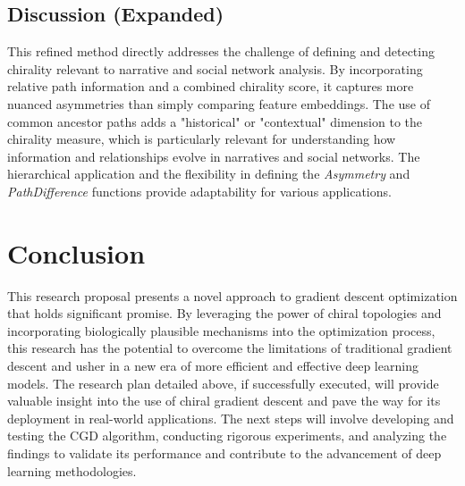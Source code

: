 \documentclass[12pt, a4paper]{article}
\begin{document}
\subsection{Discussion (Expanded)}

This refined method directly addresses the challenge of defining and detecting chirality relevant to narrative and social network analysis. By incorporating relative path information and a combined chirality score, it captures more nuanced asymmetries than simply comparing feature embeddings. The use of common ancestor paths adds a "historical" or "contextual" dimension to the chirality measure, which is particularly relevant for understanding how information and relationships evolve in narratives and social networks. The hierarchical application and the flexibility in defining the \textit{Asymmetry} and \textit{PathDifference} functions provide adaptability for various applications.




\section{Conclusion}
This research proposal presents a novel approach to gradient descent optimization that holds significant promise. By leveraging the power of chiral topologies and incorporating biologically plausible mechanisms into the optimization process, this research has the potential to overcome the limitations of traditional gradient descent and usher in a new era of more efficient and effective deep learning models. The research plan detailed above, if successfully executed, will provide valuable insight into the use of chiral gradient descent and pave the way for its deployment in real-world applications. The next steps will involve developing and testing the CGD algorithm, conducting rigorous experiments, and analyzing the findings to validate its performance and contribute to the advancement of deep learning methodologies.


\end{document}
